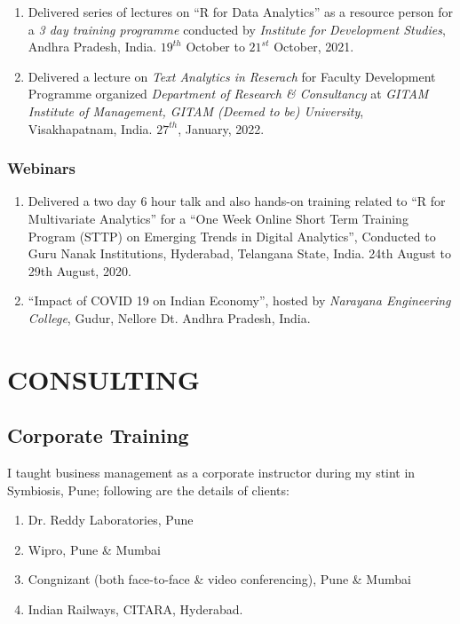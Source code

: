 \documentclass[10pt]{article}
\begin{document}
\begin{enumerate}
\item Delivered series of lectures on \enquote{R for Data Analytics} as a resource person for a \emph{3 day training programme} conducted by \emph{Institute for Development Studies}, Andhra Pradesh, India. $19^{th}$ October to $21^{st}$ October, 2021. 

\item Delivered a lecture on \emph{Text Analytics in Reserach} for Faculty Development Programme organized \emph{Department of Research \& Consultancy} at \emph{GITAM Institute of Management, GITAM (Deemed to be) University}, Visakhapatnam, India. $27^{th}$, January, 2022. 


\end{enumerate}

\subsubsection{Webinars}

\begin{enumerate}

\item Delivered a two day 6 hour talk and also hands-on training related to \enquote{R for Multivariate Analytics} for a \enquote{One Week Online Short Term Training Program (STTP) on Emerging Trends in Digital Analytics}, Conducted to Guru Nanak Institutions, Hyderabad, Telangana State, India. 24th August to 29th August, 2020.

\item \enquote{Impact of COVID 19 on Indian Economy}, hosted by \emph{Narayana Engineering College}, Gudur, Nellore Dt. Andhra Pradesh, India. 

\end{enumerate} 



\section{CONSULTING} \hline \vspace{0.5cm}

\subsection{Corporate Training}

I taught business management as a corporate instructor during my stint in Symbiosis, Pune; following are the details of clients:
\begin{enumerate} \item Dr. Reddy Laboratories, Pune \item Wipro, Pune \& Mumbai \item Congnizant (both face-to-face \& video conferencing), Pune \& Mumbai \item Indian Railways, CITARA, Hyderabad. \end{enumerate} 
\end{document}
